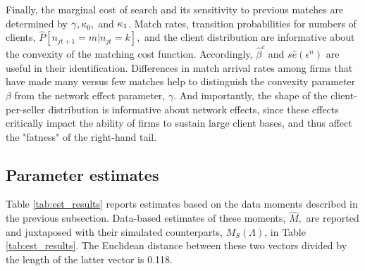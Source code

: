 \documentclass[12pt,titlepage]{article}
\begin{document}
Finally, the marginal cost of search and its sensitivity to previous matches
are determined by ${\normalsize \gamma ,\kappa }_{0}{\normalsize ,}$ and $%
{\normalsize \kappa }_{1}$. Match rates, transition probabilities for
numbers of clients, $\widehat{P}[n_{jt+1}=m|n_{jt}=k],$ and the client
distribution are informative about the convexity of the matching cost
function. Accordingly, $\widehat{\beta }^{c}$ and $s\widehat{e}(\epsilon
^{n})$ are useful in their identification. Differences in match arrival
rates among firms that have made many versus few matches help to distinguish
the convexity parameter $\beta $ from the network effect parameter, $\gamma
. $ And importantly, the shape of the client-per-seller distribution is
informative about network effects, since these effects critically impact the
ability of firms to sustain large client bases, and thus affect the
"fatness" of the right-hand tail.

\subsection{Parameter estimates}

Table \ref{tab:est_results} reports estimates based on the data moments described in the
previous subsection. Data-based estimates of these moments, $\widehat{M},$
are reported and juxtaposed with their simulated counterparts, $%
M_{S}(\Lambda )$, in Table \ref{tab:est_results}.\footnotemark{} The Euclidean distance between these two
vectors divided by the length of the latter vector is 0.118.
\end{document}
